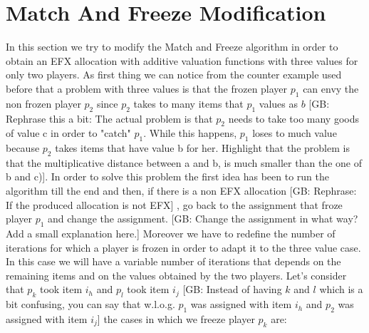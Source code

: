 \documentclass{article}
\newcommand{\gb}[1]{{\color{red}[GB: #1]}}
\begin{document}
\section{Match And Freeze Modification}
In this section we try to modify the Match and Freeze algorithm in order to obtain an EFX allocation with additive valuation functions with three values for only two players. As first thing we can notice from the counter example used before that a problem with three values is that the frozen player $p_1$ can envy the non frozen player $p_2$ since $p_2$ takes to many items that $p_1$ values as $b$ 
\gb{Rephrase this a bit: The actual problem is that $p_2$ needs to take too many goods of value c in order to "catch" $p_1$. While this happens, $p_1$ loses to much  value because $p_2$ takes items that have value b for her. Highlight that the problem is that the multiplicative distance between a and b, is much smaller than the one of b and c)}. 
In order to solve this problem the first idea has been to run the algorithm till the end and then, if there is a non EFX allocation
\gb{Rephrase: If the produced allocation is not EFX}
, go back to the assignment that froze player $p_1$ and change the assignment.
\gb{Change the assignment in what way? Add a small explanation here.}
Moreover we have to redefine the number of iterations for which a player is frozen in order to adapt it to the three value case. In this case we will have a variable number of iterations that depends on the remaining items and on the values obtained by the two players. Let's consider that $p_k$ took item $i_h$ and $p_l$ took item $i_j$
\gb{Instead of having $k$ and $l$ which is a bit confusing, you can say that w.l.o.g. $p_1$ was assigned with item $i_h$ and $p_2$ was assigned with item $i_j$}
the cases in which we freeze player $p_k$ are: 
\end{document}
